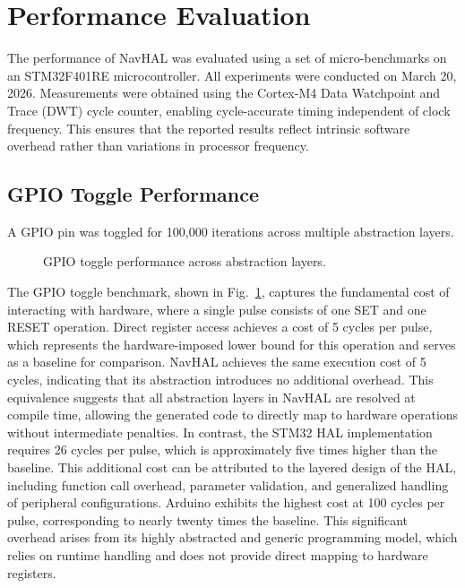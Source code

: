 \section{Performance Evaluation}
\label{sec:navhal_performance}

The performance of NavHAL was evaluated using a set of micro-benchmarks on an STM32F401RE microcontroller. All experiments were conducted on March 20, 2026. Measurements were obtained using the Cortex-M4 Data Watchpoint and Trace (DWT) cycle counter, enabling cycle-accurate timing independent of clock frequency. This ensures that the reported results reflect intrinsic software overhead rather than variations in processor frequency.

\subsection{GPIO Toggle Performance}

A GPIO pin was toggled for 100,000 iterations across multiple abstraction layers.

\begin{figure}[H]
\centering
{}
\caption{GPIO toggle performance across abstraction layers.}
\label{fig:gpio_perf}
\end{figure}

The GPIO toggle benchmark, shown in Fig.~\ref{fig:gpio_perf}, captures the fundamental cost of interacting with hardware, where a single pulse consists of one SET and one RESET operation. Direct register access achieves a cost of 5 cycles per pulse, which represents the hardware-imposed lower bound for this operation and serves as a baseline for comparison. NavHAL achieves the same execution cost of 5 cycles, indicating that its abstraction introduces no additional overhead. This equivalence suggests that all abstraction layers in NavHAL are resolved at compile time, allowing the generated code to directly map to hardware operations without intermediate penalties. In contrast, the STM32 HAL implementation requires 26 cycles per pulse, which is approximately five times higher than the baseline. This additional cost can be attributed to the layered design of the HAL, including function call overhead, parameter validation, and generalized handling of peripheral configurations. Arduino exhibits the highest cost at 100 cycles per pulse, corresponding to nearly twenty times the baseline. This significant overhead arises from its highly abstracted and generic programming model, which relies on runtime handling and does not provide direct mapping to hardware registers.

